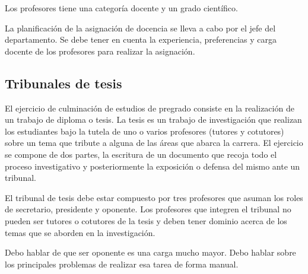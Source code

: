 Los profesores tiene una categoría docente y un grado científico.



La planificación de la asignación de docencia se lleva a cabo por el jefe del 
departamento. Se debe tener en cuenta la experiencia, preferencias y carga docente 
de los profesores para realizar la asignación. 







\subsection{Tribunales de tesis}

El ejercicio de culminación de estudios de pregrado consiste en la 
realización de un trabajo de diploma o tesis.
La tesis es un trabajo de investigación que realizan
los estudiantes bajo la tutela de uno o varios profesores (tutores y cotutores)
sobre un tema que tribute a alguna de las áreas que abarca la carrera.
El ejercicio se compone de dos partes, la escritura de un documento que recoja
todo el proceso investigativo y posteriormente la exposición o defensa del mismo ante 
un tribunal.

El tribunal de tesis debe estar compuesto por tres profesores que asuman los roles de 
secretario, presidente y oponente. Los profesores que integren el tribunal no pueden 
ser tutores o cotutores de la tesis y deben tener 
dominio acerca de los temas que se aborden en la investigación.

Debo hablar de que ser oponente es una carga mucho mayor.
Debo hablar sobre los principales problemas de realizar esa tarea 
de forma manual.



